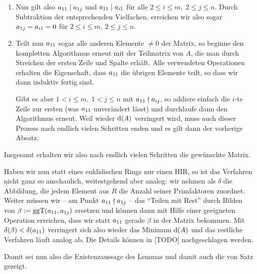\begin{proofsketch}
\begin{enumerate}[1.]
        \item
            Nun gilt also $a_{11} \mid a_{1j}$ und $a_{11} \mid a_{i1}$ für alle
            $2\leq i\leq m,\; 2\leq j\leq n$. Durch Subtraktion der entsprechenden
            Vielfachen, erreichen wir also sogar $a_{1j} = a_{i1} = 0$ für
            $2\leq i\leq m$, $2\leq j\leq n$.
            
        \item
            Teilt nun $a_{11}$ sogar alle anderen Elemente $\neq 0$ der Matrix, so
            beginne den kompletten Algorithmus erneut mit der Teilmatrix von
            $A$, die man durch Streichen der ersten Zeile und Spalte erhält.
            Alle verwendeten Operationen erhalten die Eigenschaft, dass $a_{11}$
            die übrigen Elemente teilt, so dass wir dann induktiv fertig sind.
            
            Gibt es aber $1<i\leq m,\; 1<j\leq n$ mit $a_{11} \nmid a_{ij}$, so
            addiere einfach die $i$-te Zeile zur ersten (was $a_{11}$ unverändert
            lässt) und durchlaufe dann den Algorithmus erneut. Weil wieder
            $\mathrm{d}(A)$ verringert wird, muss auch dieser Prozess nach endlich
            vielen Schritten enden und es gilt dann der vorherige Absatz.
    \end{enumerate}
    Insgesamt erhalten wir also nach endlich vielen Schritten die gewünschte
    Matrix.
    
    Haben wir nun statt eines euklidischen Rings nur einen HIR, so ist das
    Verfahren nicht ganz so anschaulich, weitestgehend aber analog: wir nehmen
    als $\delta$ die Abbildung, die jedem Element aus $R$ die Anzahl seiner
    Primfaktoren zuordnet. Weiter müssen wir -- am Punkt $a_{11} \nmid a_{1j}$ --
    das \enquote{Teilen mit Rest} durch Bilden von 
    $\beta := \mathrm{ggT}(a_{11},a_{1j})$ ersetzen und können dann mit Hilfe einer
    geeigneten Operation erreichen, dass wir statt $a_{11}$ gerade $\beta$ in
    der Matrix bekommen. Mit $\delta(\beta) < \delta(a_{11})$ verringert sich also
    wieder das Minimum $\mathrm{d}(A)$ und das restliche Verfahren läuft analog ab. Die
    Details können in [TODO] %
    nachgeschlagen werden.
    
    Damit sei nun also die Existenzaussage des Lemmas und damit auch die von
    Satz %
    gezeigt.
    \\
\end{proofsketch}











